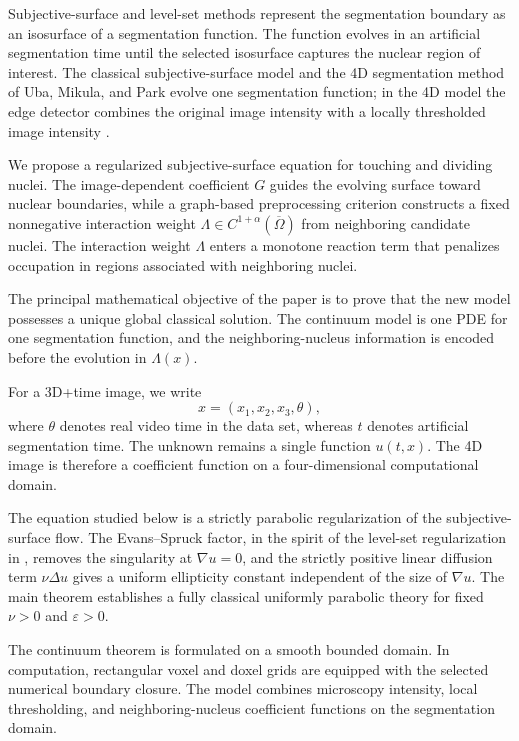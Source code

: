 \documentclass[11pt]{article}
\theoremstyle{remark}
\newcommand{\eps}{\varepsilon}
\newcommand{\nupar}{\nu}
\begin{document}
Subjective-surface and level-set methods represent the segmentation boundary as an isosurface of a segmentation function. The function evolves in an artificial segmentation time until the selected isosurface captures the nuclear region of interest. The classical subjective-surface model and the 4D segmentation method of Uba, Mikula, and Park evolve one segmentation function; in the 4D model the edge detector combines the original image intensity with a locally thresholded image intensity \cite{SartiMalladiSethian2000,umknskp2020,UbaMikulaPark2023}.

We propose a regularized subjective-surface equation for touching and dividing nuclei. The image-dependent coefficient $G$ guides the evolving surface toward nuclear boundaries, while a graph-based preprocessing criterion constructs a fixed nonnegative interaction weight $\Lambda\in C^{1+\alpha}(\overline\Omega)$ from neighboring candidate nuclei. The interaction weight $\Lambda$ enters a monotone reaction term that penalizes occupation in regions associated with neighboring nuclei.

The principal mathematical objective of the paper is to prove that the new model possesses a unique global classical solution. The continuum model is one PDE for one segmentation function, and the neighboring-nucleus information is encoded before the evolution in $\Lambda(x)$.

For a 3D+time image, we write
\[
        x=(x_1,x_2,x_3,\theta),
\]
where $\theta$ denotes real video time in the data set, whereas $t$ denotes artificial segmentation time.  The unknown remains a single function $u(t,x)$.  The 4D image is therefore a coefficient function on a four-dimensional computational domain.

The equation studied below is a strictly parabolic regularization of the subjective-surface flow.  The Evans--Spruck factor, in the spirit of the level-set regularization in \cite{EvansSpruck1991}, removes the singularity at $\nabla u=0$, and the strictly positive linear diffusion term $\nupar\Delta u$ gives a uniform ellipticity constant independent of the size of $\nabla u$.  The main theorem establishes a fully classical uniformly parabolic theory for fixed $\nupar>0$ and $\eps>0$.

The continuum theorem is formulated on a smooth bounded domain. In computation, rectangular voxel and doxel grids are equipped with the selected numerical boundary closure. The model combines microscopy intensity, local thresholding, and neighboring-nucleus coefficient functions on the segmentation domain.
\end{document}
